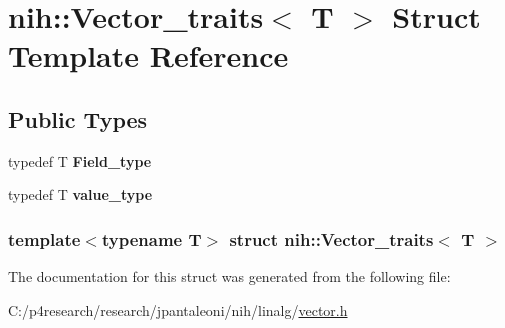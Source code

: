 \hypertarget{structnih_1_1_vector__traits}{
\section{nih\-:\-:\-Vector\-\_\-traits$<$ \-T $>$ \-Struct \-Template \-Reference}
\label{structnih_1_1_vector__traits}
}
\subsection*{\-Public \-Types}
\begin{DoxyCompactItemize}
\item 
\hypertarget{structnih_1_1_vector__traits_ad16c08f13a1ef88052f4bc714a02105d}{
typedef \-T {\bfseries \-Field\-\_\-type}}
\label{structnih_1_1_vector__traits_ad16c08f13a1ef88052f4bc714a02105d}

\item 
\hypertarget{structnih_1_1_vector__traits_a153954db2584ef66b56e53dd1a99615f}{
typedef \-T {\bfseries value\-\_\-type}}
\label{structnih_1_1_vector__traits_a153954db2584ef66b56e53dd1a99615f}

\end{DoxyCompactItemize}
\subsubsection*{template$<$typename T$>$ struct nih\-::\-Vector\-\_\-traits$<$ T $>$}



\-The documentation for this struct was generated from the following file\-:\begin{DoxyCompactItemize}
\item 
\-C\-:/p4research/research/jpantaleoni/nih/linalg/\hyperlink{vector_8h}{vector.\-h}\end{DoxyCompactItemize}
